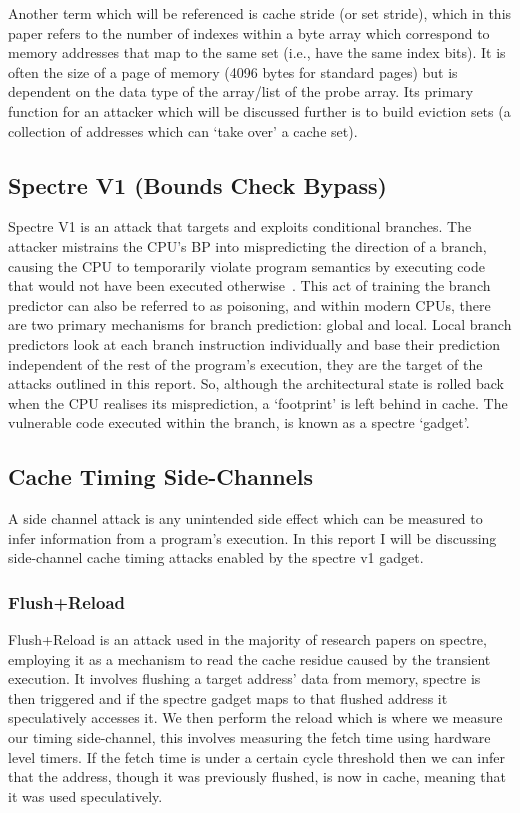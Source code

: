 \documentclass[11pt,a4paper, notitlepage]{article}
\begin{document}
Another term which will be referenced is cache stride (or set stride), which in this paper refers to the number of indexes within a byte array which correspond 
to memory addresses that map to the same set (i.e., have the same index bits). It is often the size of a page of memory (4096 bytes for standard pages) 
but is dependent on the data type of the array/list of the probe array. Its primary function for an attacker which will be discussed further is to build eviction sets 
(a collection of addresses which can `take over' a cache set).


\subsection{Spectre V1 (Bounds Check Bypass)}
Spectre V1 is an attack that targets and exploits conditional branches. The attacker mistrains the CPU’s BP into mispredicting the direction of a branch, causing the CPU to temporarily violate program semantics by executing code that would not have been executed otherwise~\cite{spectre_og}.
This act of training the branch predictor can also be referred to as poisoning, and within modern CPUs, there are two primary mechanisms for branch prediction: global and local.
Local branch predictors look at each branch instruction individually and base their prediction independent of the rest of the program's execution, they are the target of the attacks outlined in this report.
So, although the architectural state is rolled back when the CPU realises its misprediction, a `footprint' is left behind in cache. The vulnerable code executed within the branch, 
is known as a spectre `gadget'.
\subsection{Cache Timing Side-Channels}
A side channel attack is any unintended side effect which can be measured to infer information from a program's execution. In this report I will be discussing side-channel cache timing attacks enabled by the spectre v1 gadget.
\subsubsection{Flush+Reload}
Flush+Reload is an attack used in the majority of research papers on spectre, employing it as a mechanism to read the cache residue caused by the transient execution.
It involves flushing a target address' data from memory, spectre is then triggered and if the spectre gadget maps to that flushed address it speculatively accesses it. We then perform the reload which is where we measure our timing side-channel, 
this involves measuring the fetch time using hardware level timers. If the fetch time is under a certain cycle threshold then we can infer that the address, though it was previously flushed, is now in cache, meaning that it was used speculatively.
\end{document}
